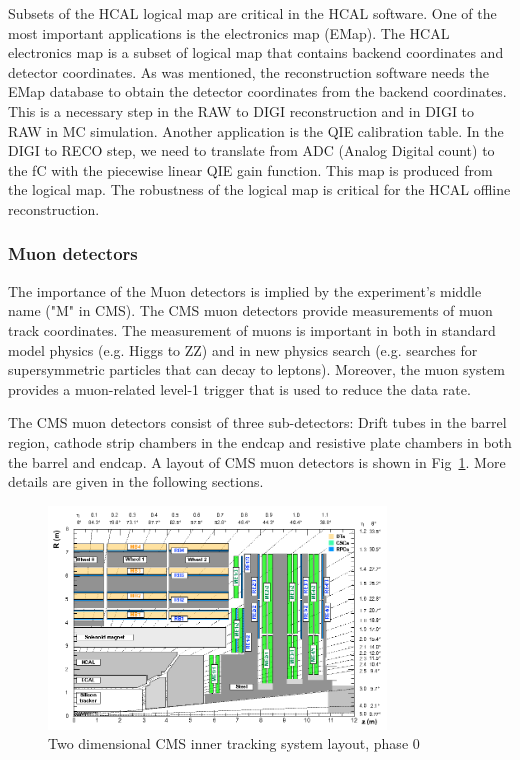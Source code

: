 Subsets of the HCAL logical map are critical in the HCAL software. One of the most important applications is the electronics map (EMap). The HCAL electronics map is a subset of logical map that contains backend coordinates and detector coordinates. As was mentioned, the reconstruction software needs the EMap database to obtain the detector coordinates from the backend coordinates. This is a necessary step in the RAW to DIGI reconstruction and in DIGI to RAW in MC simulation. Another application is the QIE calibration table. In the DIGI to RECO step, we need to translate from ADC (Analog Digital count) to the fC with the piecewise linear QIE gain function. This map is produced from the logical map. The robustness of the logical map is critical for the HCAL offline reconstruction. 

\subsubsection{Muon detectors}

The importance of the Muon detectors is implied by the experiment’s middle name ("M" in CMS). The CMS muon detectors provide measurements of muon track coordinates. The measurement of muons is important in both in standard model physics (e.g. Higgs to ZZ) and in new physics search (e.g. searches for supersymmetric particles that can decay to leptons). Moreover, the muon system provides a muon-related level-1 trigger that is used to reduce the data rate.

The CMS muon detectors consist of three sub-detectors: Drift tubes in the barrel region, cathode strip chambers in the endcap and resistive plate chambers in both the barrel and endcap. A layout of CMS muon detectors is shown in Fig~\ref{fig:c3cms2dmuondets}. More details are given in the following sections. 

\begin{figure}[htbp]
 \begin{center}
  \includegraphics[width=0.8\textwidth]{figures/c3/c3_cms_2dmuondets.png}
 \end{center}
 \caption{Two dimensional CMS inner tracking system layout, phase 0}
 \label{fig:c3cms2dmuondets}
\end{figure}

